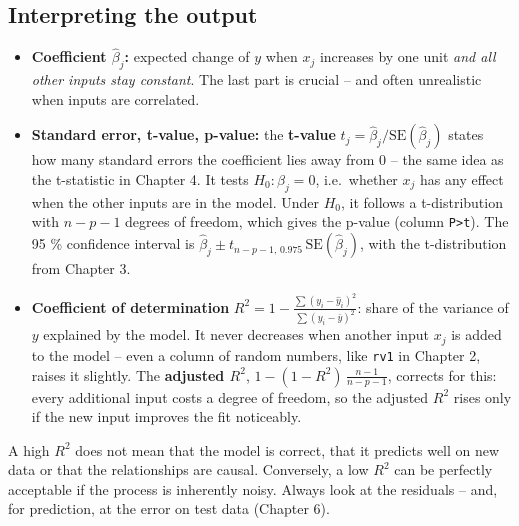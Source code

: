 \documentclass[
  letterpaper,
  DIV=11,
  numbers=noendperiod]{scrreprt}
\providecommand{\tightlist}{%
  \setlength{\itemsep}{0pt}\setlength{\parskip}{0pt}}\usepackage{longtable,booktabs,array}
\begin{document}
\subsection{Interpreting the output}\label{interpreting-the-output}

\begin{itemize}
\tightlist
\item
  \textbf{Coefficient \(\hat\beta_j\):} expected change of \(y\) when
  \(x_j\) increases by one unit \emph{and all other inputs stay
  constant}. The last part is crucial -- and often unrealistic when
  inputs are correlated.
\item
  \textbf{Standard error, t-value, p-value:} the \textbf{t-value}
  \(t_j = \hat\beta_j / \text{SE}(\hat\beta_j)\) states how many
  standard errors the coefficient lies away from 0 -- the same idea as
  the t-statistic in Chapter 4. It tests \(H_0: \beta_j = 0\),
  i.e.~whether \(x_j\) has any effect when the other inputs are in the
  model. Under \(H_0\), it follows a t-distribution with \(n - p - 1\)
  degrees of freedom, which gives the p-value (column
  \texttt{P\textgreater{}\textbar{}t\textbar{}}). The 95 \% confidence
  interval is
  \(\hat\beta_j \pm t_{n-p-1,\,0.975}\,\text{SE}(\hat\beta_j)\), with
  the t-distribution from Chapter 3.
\item
  \textbf{Coefficient of determination}
  \(R^2 = 1 - \frac{\sum (y_i - \hat y_i)^2}{\sum (y_i - \bar y)^2}\):
  share of the variance of \(y\) explained by the model. It never
  decreases when another input \(x_j\) is added to the model -- even a
  column of random numbers, like \texttt{rv1} in Chapter 2, raises it
  slightly. The \textbf{adjusted \(R^2\)},
  \(1 - (1 - R^2)\,\frac{n - 1}{n - p - 1}\), corrects for this: every
  additional input costs a degree of freedom, so the adjusted \(R^2\)
  rises only if the new input improves the fit noticeably.
\end{itemize}

\begin{tcolorbox}[enhanced jigsaw, left=2mm, title=\textcolor{quarto-callout-warning-color}{\faExclamationTriangle}\hspace{0.5em}{Pitfall: R² measures fit, not validity}, opacityback=0, breakable, rightrule=.15mm, arc=.35mm, toptitle=1mm, colbacktitle=quarto-callout-warning-color!10!white, opacitybacktitle=0.6, coltitle=black, colframe=quarto-callout-warning-color-frame, bottomrule=.15mm, leftrule=.75mm, bottomtitle=1mm, titlerule=0mm, toprule=.15mm, colback=white]

A high \(R^2\) does not mean that the model is correct, that it predicts
well on new data or that the relationships are causal. Conversely, a low
\(R^2\) can be perfectly acceptable if the process is inherently noisy.
Always look at the residuals -- and, for prediction, at the error on
test data (Chapter 6).

\end{tcolorbox}
\end{document}
